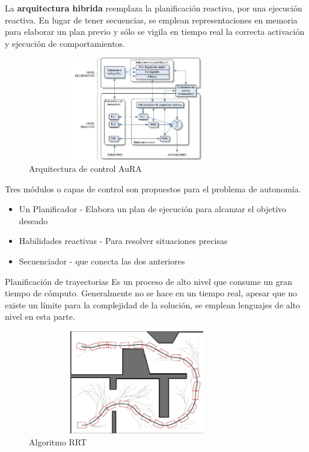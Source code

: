\documentclass[
	11pt, %
]{beamer}
\begin{document}
\begin{frame}{}
  La \textbf{arquitectura hibrida} reemplaza la planificaci\'{o}n reactiva, por una ejecuci\'{o}n reactiva. En lugar de tener secuencias, se emplean representaciones en memoria para elaborar un plan previo y s\'{o}lo se vigila en tiempo real la correcta activaci\'{o}n y ejecuci\'{o}n de comportamientos.
  \begin{figure}
    \centering
    \includegraphics[width=9.5cm, height=4.5cm]{arquitectura_robot.jpg}
    \caption[Caption for LOF]{Arquitectura de control AuRA\protect\footnotemark}
  \end{figure}
\end{frame}

\begin{frame}{}
  Tres m\'{o}dulos o capas de control son propuestos para el problema de autonom\'{i}a.
  \bigskip %
  \begin{itemize}
  \item Un Planificador - Elabora un plan de ejecuci\'{o}n para alcanzar el objetivo deseado
  \item Habilidades reactivas - Para resolver situaciones precisas
  \item Secuenciador - que conecta las dos anteriores
  \end{itemize}
\end{frame}

\begin{frame}{Planificaci\'{o}n de trayectorias}
  Es un proceso de alto nivel que consume un gran tiempo de c\'{o}mputo. Generalmente no se hace en un tiempo real, apesar que no existe un l\'{i}mite para la complejidad de la soluci\'{o}n, se emplean lenguajes de alto nivel en esta parte.\\

  \begin{figure}
    \centering
    \includegraphics[width=9.5cm, height=4.5cm]{rrt}
    \caption[Caption for LOF]{Algoritmo RRT\protect\footnotemark}
  \end{figure}
  
\end{frame}
\end{document}
